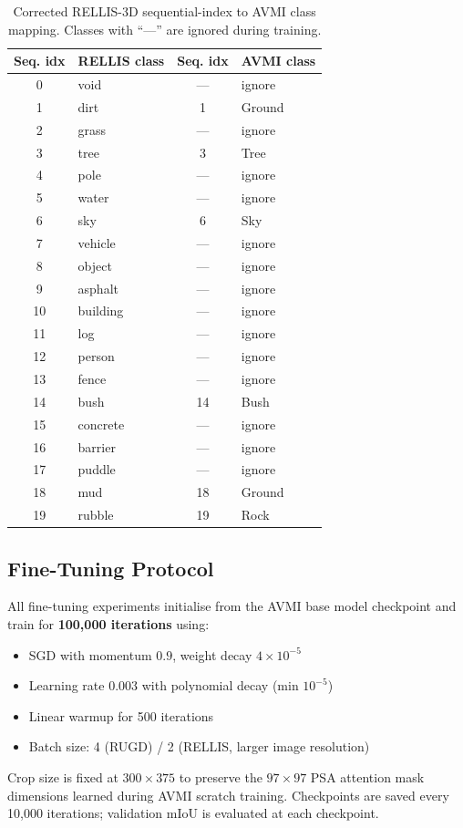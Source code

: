 \begin{table}[h]
\centering
\caption{Corrected RELLIS-3D sequential-index to AVMI class mapping.
         Classes with ``---'' are ignored during training.}
\label{tab:rellis_map}
\begin{tabular}{clcl}
\toprule
\textbf{Seq. idx} & \textbf{RELLIS class} & \textbf{Seq. idx} & \textbf{AVMI class} \\
\midrule
0  & void     & --- & ignore \\
1  & dirt     &  1  & Ground \\
2  & grass    & --- & ignore \\
3  & tree     &  3  & Tree   \\
4  & pole     & --- & ignore \\
5  & water    & --- & ignore \\
6  & sky      &  6  & Sky    \\
7  & vehicle  & --- & ignore \\
8  & object   & --- & ignore \\
9  & asphalt  & --- & ignore \\
10 & building & --- & ignore \\
11 & log      & --- & ignore \\
12 & person   & --- & ignore \\
13 & fence    & --- & ignore \\
14 & bush     & 14  & Bush   \\
15 & concrete & --- & ignore \\
16 & barrier  & --- & ignore \\
17 & puddle   & --- & ignore \\
18 & mud      & 18  & Ground \\
19 & rubble   & 19  & Rock   \\
\bottomrule
\end{tabular}
\end{table}

\subsection{Fine-Tuning Protocol}

All fine-tuning experiments initialise from the AVMI base model checkpoint
and train for \textbf{100,000 iterations} using:
\begin{itemize}
    \item SGD with momentum $0.9$, weight decay $4\times10^{-5}$
    \item Learning rate $0.003$ with polynomial decay (min $10^{-5}$)
    \item Linear warmup for 500 iterations
    \item Batch size: 4 (RUGD) / 2 (RELLIS, larger image resolution)
\end{itemize}
Crop size is fixed at $300\times375$ to preserve the $97\times97$ PSA
attention mask dimensions learned during AVMI scratch training.  Checkpoints
are saved every 10,000 iterations; validation mIoU is evaluated at each
checkpoint.

